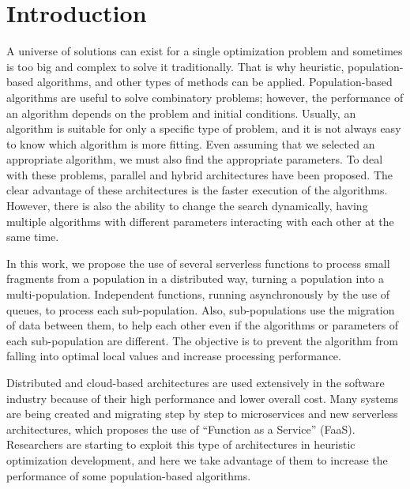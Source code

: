 \documentclass[runningheads]{llncs}
\begin{document}
\section{Introduction}
A universe of solutions can exist for a single optimization problem and
sometimes is too big and complex to solve it traditionally. That is why
heuristic, population-based algorithms, and other types of methods can be
applied.  Population-based algorithms are useful to solve combinatory problems;
however,  the performance of an algorithm depends on the problem and initial
conditions. Usually, an algorithm is suitable for only a specific type of
problem, and it is not always easy to know which algorithm is more fitting. Even
assuming that we selected an appropriate algorithm, we must also find the
appropriate parameters. To deal with these problems, parallel and hybrid
architectures have been proposed. The clear advantage of these architectures is
the faster execution of the algorithms. However, there is also the ability to
change the search dynamically, having multiple algorithms with different
parameters interacting with each other at the same time. 

In this work, we propose the use of several serverless functions to process
small fragments from a population in a distributed way, turning a population
into a multi-population. Independent functions, running asynchronously by the 
use of queues, to process each sub-population. Also, sub-populations use the migration of data
between them, to help each other even if the algorithms or parameters of each
sub-population are different. The objective is to prevent the algorithm from
falling into optimal local values and increase processing performance.

Distributed and cloud-based architectures are used extensively in the software
industry because of their high performance and lower overall cost.  Many systems
are being created and migrating step by step to microservices and new serverless
architectures, which proposes the use of “Function as a Service” (FaaS).
Researchers are starting to exploit this type of architectures \cite{Hellerstein2018,Everywhere,Baird2016} in
heuristic optimization development, and here we take advantage of them to
increase the performance of some population-based algorithms.
\end{document}
